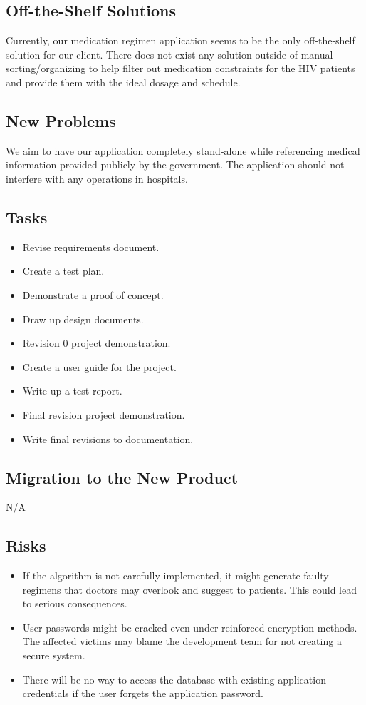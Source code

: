 \documentclass[12pt]{article}
\begin{document}
\subsection{Off-the-Shelf Solutions }
Currently, our medication regimen application seems to be the only off-the-shelf solution for our client. There does not exist any solution outside of manual sorting/organizing to help filter out medication constraints for the HIV patients and provide them with the ideal dosage and schedule.

\subsection{New Problems }
We aim to have our application completely stand-alone while referencing medical information provided publicly by the government. The application should not interfere with any operations in hospitals.

\subsection{Tasks}
\begin{itemize}
\item Revise requirements document.
\item Create a test plan.
\item Demonstrate a proof of concept.
\item Draw up design documents.
\item Revision 0 project demonstration.
\item Create a user guide for the project.
\item Write up a test report.
\item Final revision project demonstration.
\item Write final revisions to documentation.
\end{itemize}

\subsection{Migration to the New Product }
N/A

\subsection{Risks}
\begin{itemize}
\item If the algorithm is not carefully implemented, it might generate faulty regimens that doctors may overlook and suggest to patients. This could lead to serious consequences.
\item User passwords might be cracked even under reinforced encryption methods. The affected victims may blame the development team for not creating a secure system.
\item There will be no way to access the database with existing application credentials if the user forgets the application password.
\end{itemize}
\end{document}
